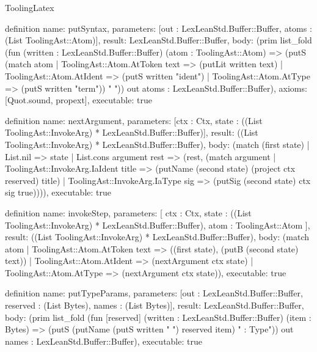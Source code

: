 \begin{lexlean}{ToolingLatex}
\begin{semanticmodule}
definition{
  name: putSyntax,
  parameters: [out : LexLeanStd.Buffer::Buffer, atoms : (List ToolingAst::Atom)],
  result: LexLeanStd.Buffer::Buffer,
  body: (prim list_fold (fun (written : LexLeanStd.Buffer::Buffer) (atom : ToolingAst::Atom) => (putS (match atom
    | ToolingAst::Atom.AtToken text => (putLit written text)
    | ToolingAst::Atom.AtIdent => (putS written "ident")
    | ToolingAst::Atom.AtType => (putS written "term")) " ")) out atoms : LexLeanStd.Buffer::Buffer),
  axioms: [Quot.sound, propext],
  executable: true
}

definition{
  name: nextArgument,
  parameters: [ctx : Ctx, state : ((List ToolingAst::InvokeArg) * LexLeanStd.Buffer::Buffer)],
  result: ((List ToolingAst::InvokeArg) * LexLeanStd.Buffer::Buffer),
  body: (match (first state)
    | List.nil => state
    | List.cons argument rest => (rest, (match argument
      | ToolingAst::InvokeArg.IaIdent title => (putName (second state) (project ctx reserved) title)
      | ToolingAst::InvokeArg.IaType sig => (putSig (second state) ctx sig true)))),
  executable: true
}

definition{
  name: invokeStep,
  parameters: [
    ctx : Ctx,
    state : ((List ToolingAst::InvokeArg) * LexLeanStd.Buffer::Buffer),
    atom : ToolingAst::Atom
  ],
  result: ((List ToolingAst::InvokeArg) * LexLeanStd.Buffer::Buffer),
  body: (match atom
    | ToolingAst::Atom.AtToken text => ((first state), (putB (second state) text))
    | ToolingAst::Atom.AtIdent => (nextArgument ctx state)
    | ToolingAst::Atom.AtType => (nextArgument ctx state)),
  executable: true
}

definition{
  name: putTypeParams,
  parameters: [out : LexLeanStd.Buffer::Buffer, reserved : (List Bytes), names : (List Bytes)],
  result: LexLeanStd.Buffer::Buffer,
  body: (prim list_fold (fun [reserved] (written : LexLeanStd.Buffer::Buffer) (item : Bytes) => (putS (putName (putS written " {") reserved item) " : Type}")) out names : LexLeanStd.Buffer::Buffer),
  executable: true
}


\end{semanticmodule}
\end{lexlean}
